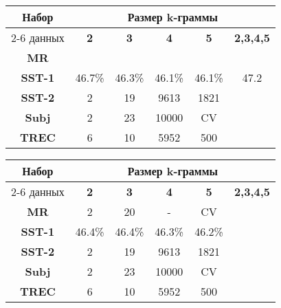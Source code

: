 \vspace{5mm}
\noindent \begin{minipage}{\linewidth}
 \label{tab:title} 
\begin{tabular}{|c|c|c|c|c|c|}
\hline
\multirow{2}{*}{Набор}   &                \multicolumn{5}{c|}{Размер k-граммы} \\ \cline{2-6} 
     данных              &   \textbf{2} & \textbf{3} & \textbf{4} & \textbf{5} & \textbf{2,3,4,5} \\ \hline
\textbf{MR}              &              &            &            &            &  \\ \hline
\textbf{SST-1}           & 46.7\%       & 46.3\%     &  46.1\%    &  46.1\%    &  47.2  \\ \hline
\textbf{SST-2}           & 2            & 19         &  9613      &  1821      & \\ \hline
\textbf{Subj}            & 2            & 23         &  10000     &  CV        & \\ \hline
\textbf{TREC}            & 6            & 10         &  5952      &  500       & \\ \hline
\end{tabular}
\end{minipage}
\vspace{5mm}

\noindent \begin{minipage}{\linewidth}
 \label{tab:title} 
\begin{tabular}{|c|c|c|c|c|c|}
\hline
\multirow{2}{*}{Набор}   &                \multicolumn{5}{c|}{Размер k-граммы} \\ \cline{2-6} 
     данных              &   \textbf{2} & \textbf{3} & \textbf{4} & \textbf{5} & \textbf{2,3,4,5} \\ \hline
\textbf{MR}              & 2            & 20         &  -     &  CV        &                      \\ \hline
\textbf{SST-1}           & 46.4\%       & 46.4\%     &  46.3\%    &  46.2\%    & \\ \hline
\textbf{SST-2}           & 2            & 19         &  9613      &  1821      & \\ \hline
\textbf{Subj}            & 2            & 23         &  10000     &  CV        & \\ \hline
\textbf{TREC}            & 6            & 10         &  5952      &  500       & \\ \hline
\end{tabular}\\
\vspace{5mm}
\end{minipage}
\vspace{5mm}


